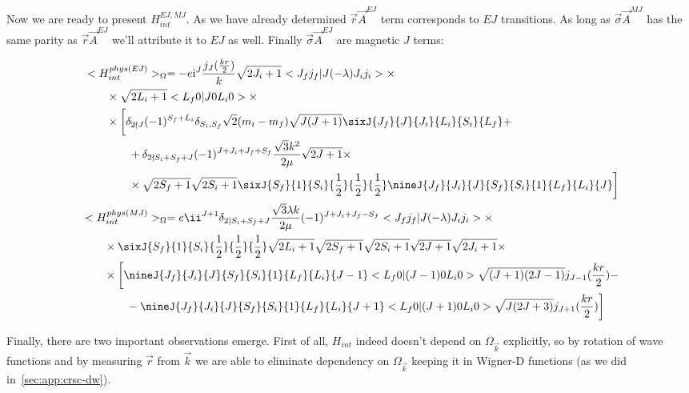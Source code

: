 Now we are ready to present $H_{int}^{EJ, MJ}$. As we have already determined $\vec{r}\vec{A}^{EJ}$ term corresponds to $EJ$ transitions. As long as $\vec{\sigma}\vec{A}^{MJ}$ has the same parity as $\vec{r}\vec{A}^{EJ}$ we'll attribute it to $EJ$ as well. Finally $\vec{\sigma} \vec{A}^{EJ}$ are magnetic $J$ terms:

\begin{align}
    \begin{split}
            &<H_{int}^{phys (EJ)}>_\Omega = -e \mathrm{i}^{J} \frac{j_J(\frac{k r}{2})}{k} \sqrt{2J_i + 1} <J_f j_f | J (-\lambda) J_i j_i> \times \\
        &\qquad\times \sqrt{2L_i + 1} <L_f 0 | J 0 L_i 0> \times \\
        &\qquad\times \bigg[ \delta_{2 \nmid J} (-1)^{S_f+L_i} \delta_{S_i, S_f} \sqrt{2}(m_i - m_f) \sqrt{J(J+1)} \sixJ{J_f}{J}{J_i}{L_i}{S_i}{L_f} +\\
        &\qquad\qquad+ \delta_{2 \nmid S_i + S_f + J} (-1)^{J+J_i+J_f + S_f} \frac{\sqrt{3} k^2}{2 \mu} \sqrt{2J+1} \times \\
        &\qquad\qquad\times \sqrt{2S_f+1} \sqrt{2S_i+1} \sixJ{S_f}{1}{S_i}{\frac{1}{2}}{\frac{1}{2}}{\frac{1}{2}} \nineJ{J_f}{J_i}{J}{S_f}{S_i}{1}{L_f}{L_i}{J} \bigg]
    \end{split} \\
    \begin{split}
        &<H_{int}^{phys (MJ)}>_\Omega = e \ii^{J+1} \delta_{2 \mid S_i+S_f+J} \frac{\sqrt{3} \lambda k}{2 \mu} (-1)^{J+J_i+J_f-S_f} <J_f j_f | J (-\lambda) J_i j_i> \times \\
        &\qquad\times \sixJ{S_f}{1}{S_i}{\frac{1}{2}}{\frac{1}{2}}{\frac{1}{2}} \sqrt{2L_i+1} \sqrt{2S_f+1} \sqrt{2S_i+1} \sqrt{2J+1} \sqrt{2J_i + 1} \times\\
        &\qquad\times \bigg[ \nineJ{J_f}{J_i}{J}{S_f}{S_i}{1}{L_f}{L_i}{J-1} <L_f 0 | (J-1) 0 L_i 0> \sqrt{(J+1)(2J-1)} j_{J-1}(\frac{kr}{2}) - \\
        &\qquad\qquad- \nineJ{J_f}{J_i}{J}{S_f}{S_i}{1}{L_f}{L_i}{J+1} <L_f 0 | (J+1) 0 L_i 0> \sqrt{J(2J+3)} j_{J+1}(\frac{kr}{2}) \bigg]
    \end{split}
\end{align}

Finally, there are two important observations emerge. First of all, $H_{int}$ indeed doesn't depend on $\Omega_{\vec{k}}$ explicitly, so by rotation of wave functions and by measuring $\vec{r}$ from $\vec{k}$ we are able to eliminate dependency on $\Omega_{\vec{k}}$ keeping it in Wigner-D functions (as we did in~\cref{sec:app:crsc-dw}).

